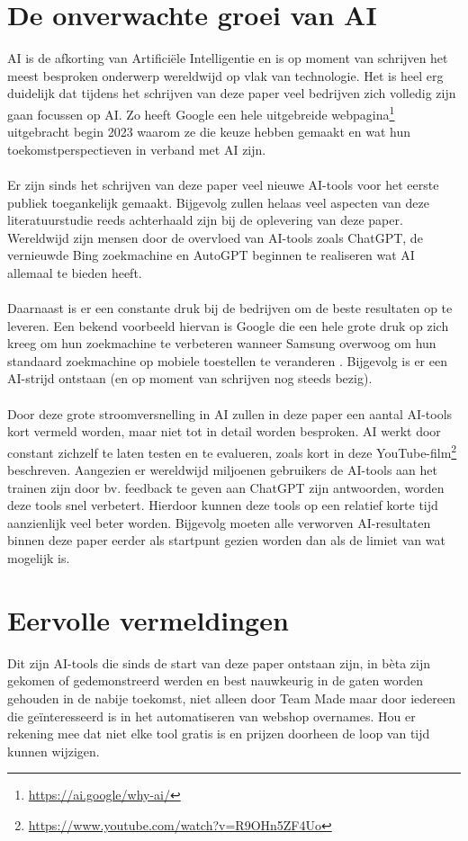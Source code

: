\section{De onverwachte groei van AI}
AI is de afkorting van Artificiële Intelligentie en is op moment van schrijven het meest besproken onderwerp wereldwijd op vlak van technologie. Het is heel erg duidelijk dat tijdens het schrijven van deze paper veel bedrijven zich volledig zijn gaan focussen op AI. Zo heeft Google een hele uitgebreide webpagina\footnote{\href{https://ai.google/why-ai/}{https://ai.google/why-ai/}} uitgebracht begin 2023 waarom ze die keuze hebben gemaakt en wat hun toekomstperspectieven in verband met AI zijn.
\\\\
Er zijn sinds het schrijven van deze paper veel nieuwe AI-tools voor het eerste publiek toegankelijk gemaakt. Bijgevolg zullen helaas veel aspecten van deze literatuurstudie reeds achterhaald zijn bij de oplevering van deze paper. Wereldwijd zijn mensen door de overvloed van AI-tools zoals ChatGPT, de vernieuwde Bing zoekmachine en AutoGPT beginnen te realiseren wat AI allemaal te bieden heeft.
\\\\
Daarnaast is er een constante druk bij de bedrijven om de beste resultaten op te leveren. Een bekend voorbeeld hiervan is Google die een hele grote druk op zich kreeg om hun zoekmachine te verbeteren wanneer Samsung overwoog om hun standaard zoekmachine op mobiele toestellen te veranderen \autocite{Paris2023}. Bijgevolg is er een AI-strijd ontstaan (en op moment van schrijven nog steeds bezig). 
\\\\
Door deze grote stroomversnelling in AI zullen in deze paper een aantal AI-tools kort vermeld worden, maar niet tot in detail worden besproken. AI werkt door constant zichzelf te laten testen en te evalueren, zoals kort in deze YouTube-film\footnote{\href{https://www.youtube.com/watch?v=R9OHn5ZF4Uo}{https://www.youtube.com/watch?v=R9OHn5ZF4Uo}} beschreven. Aangezien er wereldwijd miljoenen gebruikers de AI-tools aan het trainen zijn door bv. feedback te geven aan ChatGPT zijn antwoorden, worden deze tools snel verbetert. Hierdoor kunnen deze tools op een relatief korte tijd aanzienlijk veel beter worden. Bijgevolg moeten alle verworven AI-resultaten binnen deze paper eerder als startpunt gezien worden dan als de limiet van wat mogelijk is.
\label{eervolle_vermeldingen}\section{Eervolle vermeldingen}
Dit zijn AI-tools die sinds de start van deze paper ontstaan zijn, in bèta zijn gekomen of gedemonstreerd werden en best nauwkeurig in de gaten worden gehouden in de nabije toekomst, niet alleen door Team Made maar door iedereen die geïnteresseerd is in het automatiseren van webshop overnames. Hou er rekening mee dat niet elke tool gratis is en prijzen doorheen de loop van tijd kunnen wijzigen.

